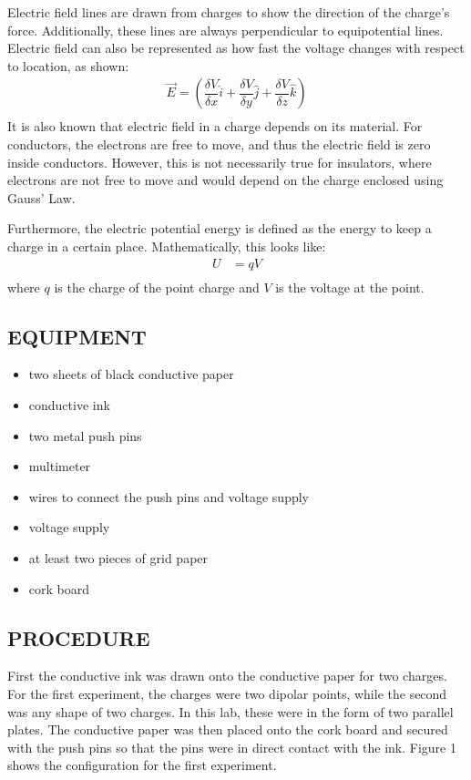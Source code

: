 \documentclass [12pt, letterpaper, twoside] {article}
\begin{document}
Electric field lines are drawn from charges to show the direction of the charge's force. Additionally, these lines are always perpendicular to equipotential lines.
Electric field can also be represented as how fast the voltage changes with respect to location, as shown:
\begin{equation}
  \begin{split}
    \vec{E} = \left(\dfrac{\delta{V}}{\delta{x}}\hat{i} + \dfrac{\delta{V}}{\delta{y}}\hat{j} + \dfrac{\delta{V}}{\delta{z}}\hat{k}\right) \\
  \end{split}
\end{equation}
It is also known that electric field in a charge depends on its material. For conductors, the electrons are free to move, and thus the electric field is zero inside conductors. However, this is not necessarily true for insulators, where electrons are not free to move and would depend on the charge enclosed using Gauss' Law.

Furthermore, the electric potential energy is defined as the energy to keep a charge in a certain place. Mathematically, this looks like:
\begin{equation}
  \begin{split}
    U &= qV \\
  \end{split}
\end{equation}
where \(q\) is the charge of the point charge and \(V\) is the voltage at the point.

\subsection* {EQUIPMENT}
  \noindent
  \begin {itemize}
    \itemsep0em
    \item {two sheets of black conductive paper}
    \item {conductive ink}
    \item {two metal push pins}
    \item {multimeter}
    \item {wires to connect the push pins and voltage supply}
    \item {voltage supply}
    \item {at least two pieces of grid paper}
    \item {cork board}
  \end {itemize}

\subsection* {PROCEDURE}
First the conductive ink was drawn onto the conductive paper for two charges. For the first experiment, the charges were two dipolar points, while the second was any shape of two charges. In this lab, these were in the form of two parallel plates. The conductive paper was then placed onto the cork board and secured with the push pins so that the pins were in direct contact with the ink. Figure 1 shows the configuration for the first experiment.
\end{document}
